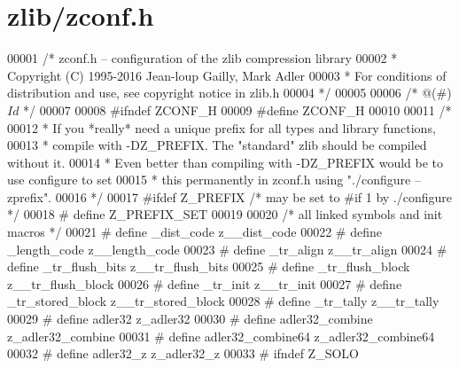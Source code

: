 \hypertarget{zlib_2zconf_8h_source}{}\section{zlib/zconf.h}
\label{zlib_2zconf_8h_source}

\begin{DoxyCode}
00001 \textcolor{comment}{/* zconf.h -- configuration of the zlib compression library}
00002 \textcolor{comment}{ * Copyright (C) 1995-2016 Jean-loup Gailly, Mark Adler}
00003 \textcolor{comment}{ * For conditions of distribution and use, see copyright notice in zlib.h}
00004 \textcolor{comment}{ */}
00005 
00006 \textcolor{comment}{/* @(#) $Id$ */}
00007 
00008 \textcolor{preprocessor}{#ifndef ZCONF\_H}
00009 \textcolor{preprocessor}{#define ZCONF\_H}
00010 
00011 \textcolor{comment}{/*}
00012 \textcolor{comment}{ * If you *really* need a unique prefix for all types and library functions,}
00013 \textcolor{comment}{ * compile with -DZ\_PREFIX. The "standard" zlib should be compiled without it.}
00014 \textcolor{comment}{ * Even better than compiling with -DZ\_PREFIX would be to use configure to set}
00015 \textcolor{comment}{ * this permanently in zconf.h using "./configure --zprefix".}
00016 \textcolor{comment}{ */}
00017 \textcolor{preprocessor}{#ifdef Z\_PREFIX     }\textcolor{comment}{/* may be set to #if 1 by ./configure */}\textcolor{preprocessor}{}
00018 \textcolor{preprocessor}{#  define Z\_PREFIX\_SET}
00019 
00020 \textcolor{comment}{/* all linked symbols and init macros */}
00021 \textcolor{preprocessor}{#  define \_dist\_code            z\_\_dist\_code}
00022 \textcolor{preprocessor}{#  define \_length\_code          z\_\_length\_code}
00023 \textcolor{preprocessor}{#  define \_tr\_align             z\_\_tr\_align}
00024 \textcolor{preprocessor}{#  define \_tr\_flush\_bits        z\_\_tr\_flush\_bits}
00025 \textcolor{preprocessor}{#  define \_tr\_flush\_block       z\_\_tr\_flush\_block}
00026 \textcolor{preprocessor}{#  define \_tr\_init              z\_\_tr\_init}
00027 \textcolor{preprocessor}{#  define \_tr\_stored\_block      z\_\_tr\_stored\_block}
00028 \textcolor{preprocessor}{#  define \_tr\_tally             z\_\_tr\_tally}
00029 \textcolor{preprocessor}{#  define adler32               z\_adler32}
00030 \textcolor{preprocessor}{#  define adler32\_combine       z\_adler32\_combine}
00031 \textcolor{preprocessor}{#  define adler32\_combine64     z\_adler32\_combine64}
00032 \textcolor{preprocessor}{#  define adler32\_z             z\_adler32\_z}
00033 \textcolor{preprocessor}{#  ifndef Z\_SOLO}

\end{DoxyCode}

